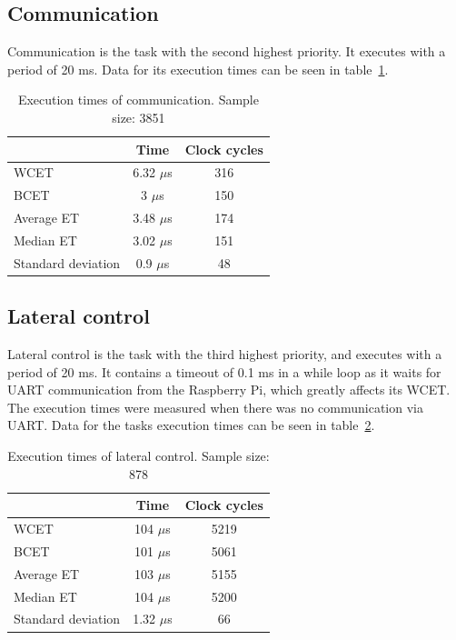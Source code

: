 \subsection{Communication}
Communication is the task with the second highest priority. It executes with a period of 20 ms. Data for its execution times can be seen in table~\ref{table:communication}.

\begin{table}[H]
\centering
\begin{tabular}{|l|c|c|}
\hline
 & Time & Clock cycles \\ \hline
WCET & 6.32 $\mu$s & 316 \\ \hline
BCET & 3 $\mu$s & 150 \\ \hline
Average ET & 3.48 $\mu$s & 174 \\ \hline
Median ET & 3.02 $\mu$s & 151 \\ \hline
Standard deviation & 0.9 $\mu$s & 48 \\ \hline
\end{tabular}
\caption{Execution times of communication. Sample size: 3851}
\label{table:communication}
\end{table}

\subsection{Lateral control}
Lateral control is the task with the third highest priority, and executes with a period of 20 ms. It contains a timeout of 0.1 ms in a while loop as it waits for UART communication from the Raspberry Pi, which greatly affects its WCET. The execution times were measured when there was no communication via UART. Data for the tasks execution times can be seen in table~\ref{table:lateral_control}.%

\begin{table}[H]
\centering
\begin{tabular}{|l|c|c|}
\hline
 & Time & Clock cycles \\ \hline
WCET & 104 $\mu$s & 5219 \\ \hline
BCET & 101 $\mu$s & 5061 \\ \hline
Average ET & 103 $\mu$s & 5155 \\ \hline
Median ET & 104 $\mu$s & 5200 \\ \hline
Standard deviation & 1.32 $\mu$s & 66 \\ \hline
\end{tabular}
\caption{Execution times of lateral control. Sample size: 878}
\label{table:lateral_control}
\end{table}

